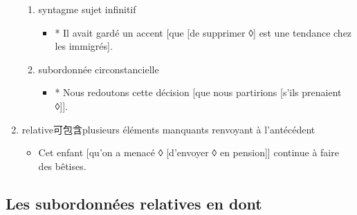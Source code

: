 \documentclass[UTF8]{report}
\begin{document}
\begin{enumerate}
\begin{enumerate}
        \item syntagme sujet infinitif 
        \begin{itemize}
            \item * Il avait gardé un accent [que [de supprimer ◊] est une tendance chez les immigrés].
        \end{itemize}
        \item subordonnée circonstancielle
        \begin{itemize}
            \item * Nous redoutons cette décision [que nous partirions [s’ils prenaient ◊]].
        \end{itemize}
    \end{enumerate}
    \item relative可包含plusieurs éléments manquants renvoyant à l’antécédent
    \begin{itemize}
        \item Cet enfant [qu’on a menacé ◊ [d’envoyer ◊ en pension]] continue à faire des bêtises.
    \end{itemize}
\end{enumerate}

\subsection{Les subordonnées relatives en dont}
\end{document}
